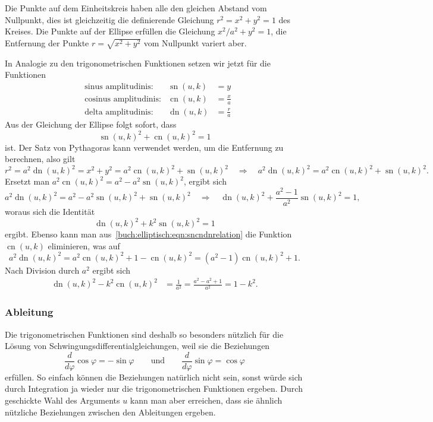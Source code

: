 Die Punkte auf dem Einheitskreis haben alle den gleichen Abstand vom
Nullpunkt, dies ist gleichzeitig die definierende Gleichung $r^2=x^2+y^2=1$
des Kreises.
Die Punkte auf der Ellipse erfüllen die Gleichung $x^2/a^2+y^2=1$,
die Entfernung der Punkte $r=\sqrt{x^2+y^2}$ vom Nullpunkt variert aber.

In Analogie zu den trigonometrischen Funktionen setzen wir jetzt für 
die Funktionen
\[
\begin{aligned}
&\text{sinus amplitudinis:}&
\operatorname{sn}(u,k)&= y \\
&\text{cosinus amplitudinis:}&
\operatorname{cn}(u,k)&= \frac{x}{a} \\
&\text{delta amplitudinis:}&
\operatorname{dn}(u,k)&=\frac{r}{a}
\end{aligned}
\]
Aus der Gleichung der Ellipse folgt sofort, dass
\[
\operatorname{sn}(u,k)^2 + \operatorname{cn}(u,k)^2 = 1
\]
ist.
Der Satz von Pythagoras kann verwendet werden, um die Entfernung zu
berechnen, also gilt
\begin{equation}
r^2
=
a^2 \operatorname{dn}(u,k)^2
=
x^2 + y^2
=
a^2\operatorname{cn}(u,k)^2 + \operatorname{sn}(u,k)^2
\quad
\Rightarrow
\quad
a^2 \operatorname{dn}(u,k)^2
=
a^2\operatorname{cn}(u,k)^2 + \operatorname{sn}(u,k)^2.
\label{buch:elliptisch:eqn:sncndnrelation}
\end{equation}
Ersetzt man
$
a^2\operatorname{cn}(u,k)^2
=
a^2-a^2\operatorname{sn}(u,k)^2
$, ergibt sich
\[
a^2 \operatorname{dn}(u,k)^2
=
a^2-a^2\operatorname{sn}(u,k)^2
+
\operatorname{sn}(u,k)^2
\quad
\Rightarrow
\quad
\operatorname{dn}(u,k)^2
+
\frac{a^2-1}{a^2}\operatorname{sn}(u,k)^2
=
1,
\]
woraus sich die Identität
\[
\operatorname{dn}(u,k)^2 + k^2 \operatorname{sn}(u,k)^2 = 1
\]
ergibt.
Ebenso kann man aus~\eqref{buch:elliptisch:eqn:sncndnrelation}
die Funktion $\operatorname{cn}(u,k)$ eliminieren, was auf
\[
a^2\operatorname{dn}(u,k)^2
=
a^2\operatorname{cn}(u,k)^2
+1-\operatorname{cn}(u,k)^2
=
(a^2-1)\operatorname{cn}(u,k)^2
+1.
\]
Nach Division durch $a^2$ ergibt sich
\begin{align*}
\operatorname{dn}(u,k)^2
-
k^2\operatorname{cn}(u,k)^2
&=
\frac{1}{a^2}
=
\frac{a^2-a^2+1}{a^2}
=
1-k^2.
\end{align*}

\subsubsection{Ableitung}
Die trigonometrischen Funktionen sind deshalb so besonders nützlich 
für die Lösung von Schwingungsdifferentialgleichungen, weil sie die
Beziehungen
\[
\frac{d}{d\varphi}  \cos\varphi = -\sin\varphi
\qquad\text{und}\qquad
\frac{d}{d\varphi}  \sin\varphi = \cos\varphi
\]
erfüllen.
So einfach können die Beziehungen natürlich nicht sein, sonst würde sich
durch Integration ja wieder nur die trigonometrischen Funktionen ergeben.
Durch geschickte Wahl des Arguments $u$ kann man aber erreichen, dass
sie ähnlich nützliche Beziehungen zwischen den Ableitungen ergeben.

